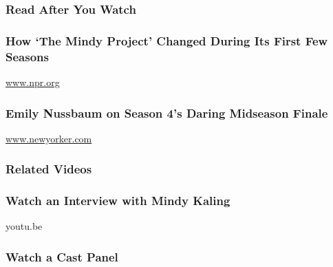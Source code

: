 \hypertarget{read-after-you-watch}{%
\subsubsection{Read After You Watch}\label{read-after-you-watch}}

\href{http://www.npr.org/sections/monkeysee/2015/03/04/390690285/mindy-and-the-little-story-that-just-might-work}{}

\hypertarget{how-the-mindy-project-changed-during-its-first-few-seasons}{%
\subsubsection{How `The Mindy Project' Changed During Its First Few
Seasons}\label{how-the-mindy-project-changed-during-its-first-few-seasons}}

\href{http://www.npr.org}{www.npr.org}

\href{http://www.newyorker.com/culture/culture-desk/mindys-happy-ending}{}

\hypertarget{emily-nussbaum-on-season-4s-daring-midseason-finale}{%
\subsubsection{Emily Nussbaum on Season 4's Daring Midseason
Finale}\label{emily-nussbaum-on-season-4s-daring-midseason-finale}}

\href{http://www.newyorker.com}{www.newyorker.com}

\hypertarget{related-videos}{%
\subsubsection{Related Videos}\label{related-videos}}

\href{https://youtu.be/Cik62wcbAE8}{}

\hypertarget{watch-an-interview-with-mindy-kaling}{%
\subsubsection{Watch an Interview with Mindy
Kaling}\label{watch-an-interview-with-mindy-kaling}}

youtu.be

\href{https://youtu.be/rDaEnmN3lNI}{}

\hypertarget{watch-a-cast-panel}{%
\subsubsection{Watch a Cast Panel}\label{watch-a-cast-panel}}


